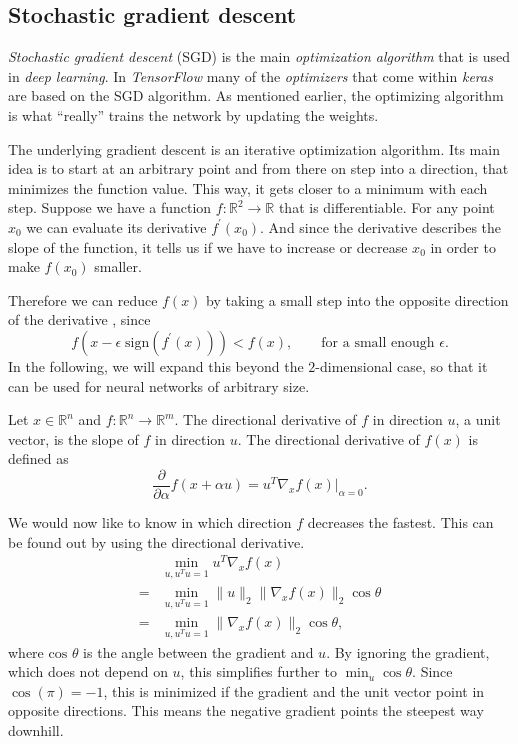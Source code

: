 \subsection{Stochastic gradient descent}
\label{sec:stochastic-gradient-descent}
\emph{Stochastic gradient descent} (SGD) is the main \emph{optimization algorithm} that is used in \emph{deep learning}.
In \emph{TensorFlow} many of the \emph{optimizers} that come within \emph{keras} are based on the SGD algorithm.
As mentioned earlier, the optimizing algorithm is what \enquote{really} trains the network by updating the weights.

The underlying gradient descent is an iterative optimization algorithm.
Its main idea is to start at an arbitrary point and from there on step into a direction, that minimizes the function value.
This way, it gets closer to a minimum with each step.
Suppose we have a function \(f : \mathbb{R}^2 \rightarrow \mathbb{R}\) that is differentiable.
For any point \(x_0\) we can evaluate its derivative \(f^{\prime}(x_0)\).
And since the derivative describes the slope of the function, it tells us if we have to increase or decrease \(x_0\) in order to make \(f(x_0)\) smaller.

Therefore we can reduce \(f(x)\) by taking a small step into the opposite direction of the derivative \cite{cauchy}, since
\begin{equation}
    \label{eq:cauchy}
    f(x - \epsilon \; \text{sign}(f^{\prime}(x))) < f(x), \qquad \text{for a small enough } \epsilon.
\end{equation}
In the following, we will expand this beyond the \(2\)-dimensional case, so that it can be used for neural networks of arbitrary size.

Let \(x \in \mathbb{R}^n\) and \(f : \mathbb{R}^n \rightarrow \mathbb{R}^m\).
The directional derivative of \(f\) in direction \(u\), a unit vector, is the slope of \(f\) in direction \(u\).
The directional derivative of \(f(x)\) is defined as 
\begin{equation}
    \frac{\partial}{\partial \alpha} f(x + \alpha u) = u^{T} \nabla_x f(x) \big\vert_{\alpha = 0}.
\end{equation}

We would now like to know in which direction \(f\) decreases the fastest.
This can be found out by using the directional derivative.
\begin{align}
      &\min_{u, u^{T}u = 1} u^{T} \nabla_x f(x) \\
    = &\min_{u, u^{T}u = 1} \lVert u \rVert_2 \lVert \nabla_x f(x) \rVert_2 \cos \theta \\
    = &\min_{u, u^{T}u = 1} \lVert \nabla_x f(x) \rVert_2 \cos \theta,
\end{align}
where \(\text{cos } \theta\) is the angle between the gradient and \(u\).
By ignoring the gradient, which does not depend on \(u\), this simplifies further to \(\min_{u} \cos \theta\).
Since \(\cos(\pi) = -1\), this is minimized if the gradient and the unit vector point in opposite directions.
This means the negative gradient points the steepest way downhill.

